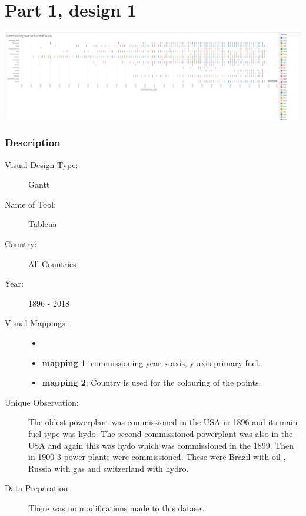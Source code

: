 \hypertarget{part-1-design-1}{%
\section{Part 1, design 1}\label{part-1-design-1}}

\centering
\includegraphics[width=15cm]{Viz1.png}

\hypertarget{description}{%
\subsubsection{Description}\label{description}}



\begin{description}
\item[Visual Design Type:]
Gantt
\item[Name of Tool:]
Tableua
\item[Country:]
All Countries
\item[Year:]
1896 - 2018
\item[Visual Mappings:]
\begin{itemize}
	\tightlist
	\item[  ]
\end{itemize}
\begin{itemize}
\tightlist
\item
  \textbf{mapping 1}: commissioning year x axis, y axis primary fuel.
\end{itemize}

\begin{itemize}
\tightlist
\item
  \textbf{mapping 2}: Country is used for the colouring of the points.
\end{itemize}
\item[Unique Observation:]
The oldest powerplant was commissioned in the USA in 1896 and its main fuel type was hydo. The second commissioned powerplant was also in the USA and again this was hydo which was commissioned in the 1899. Then in 1900 3 power plants were commissioned. These were Brazil with oil , Russia with gas and switzerland with hydro.

\item[Data Preparation:]
There was no modifications made to this dataset.
\end{description}

